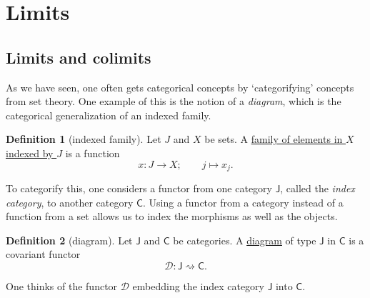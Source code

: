 \documentclass[a4paper]{report}
\newcommand{\defn}[1]{\ul{#1}}
\theoremstyle{definition}
\newtheorem{definition}{Definition}[section]
\theoremstyle{plain}
\theoremstyle{remark}
\begin{document}
\section{Limits} \label{sec:limits}
\subsection{Limits and colimits}
As we have seen, one often gets categorical concepts by `categorifying' concepts from set theory. One example of this is the notion of a \emph{diagram}, which is the categorical generalization of an indexed family.

\begin{definition}[indexed family]
  \label{def:indexedfamily}
  Let $J$ and $X$ be sets. A \defn{family of elements in $X$ indexed by $J$} is a function
  \begin{equation*}
    x\colon J \to X;\qquad j \mapsto x_{j}.
  \end{equation*}
\end{definition}

To categorify this, one considers a functor from one category $\mathsf{J}$, called the \emph{index category}, to another category $\mathsf{C}$. Using a functor from a category instead of a function from a set allows us to index the morphisms as well as the objects. 

\begin{definition}[diagram]
  \label{def:diagram}
  Let $\mathsf{J}$ and $\mathsf{C}$ be categories. A \defn{diagram} of type $\mathsf{J}$ in $\mathsf{C}$ is a covariant functor
  \begin{equation*}
    \mathcal{D}\colon \mathsf{J} \rightsquigarrow \mathsf{C}.
  \end{equation*}
\end{definition}

One thinks of the functor $\mathcal{D}$ embedding the index category $\textsf{J}$ into $\mathsf{C}$.
\end{document}
